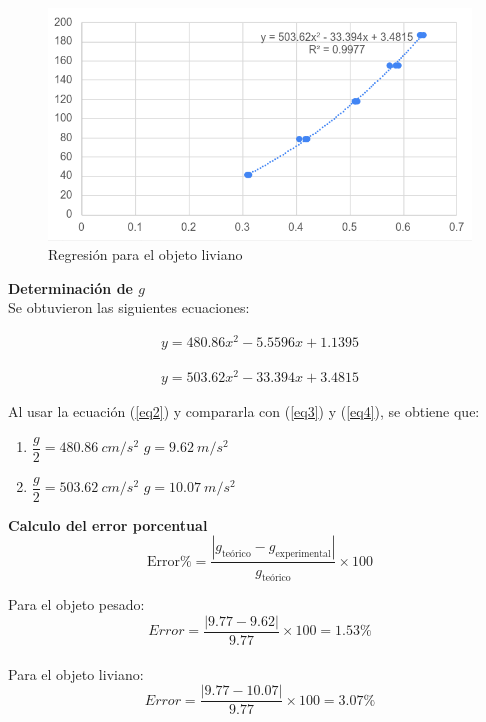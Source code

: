 \begin{multicols}{2}
\begin{figure}[H]
    \caption{Regresión para el objeto liviano}
    \centering
    \includegraphics[scale=0.5]{fig/regresion-ObjetoLiviano.png}
\end{figure}

\textbf{Determinación de $g$} \\
Se obtuvieron las siguientes ecuaciones:

\begin{align}\label{eq3}
    y = 480.86x^2 - 5.5596x + 1.1395
\end{align}

\begin{align}\label{eq4}
    y = 503.62x^2 - 33.394x + 3.4815
\end{align}

Al usar la ecuación (\ref{eq2}) y compararla con (\ref{eq3}) y (\ref{eq4}), se obtiene que:
\begin{enumerate}
    \item $\dfrac{g}{2} = 480.86 \ cm/s^2$ \hspace{1cm} $g = 9.62 \ m/s^2$
    \item $\dfrac{g}{2} = 503.62 \ cm/s^2$ \hspace{1cm} $g = 10.07 \ m/s^2$
\end{enumerate}

\textbf{Calculo del error porcentual} \\

\[\text{Error\%} = \frac{|g_{\text{teórico}} - g_{\text{experimental}}|}{g_{\text{teórico}}} \times 100 \]

Para el objeto pesado: \[Error = \dfrac{|9.77 - 9.62|}{9.77} \times 100 = 1.53\%\] \\
Para el objeto liviano: \[Error = \dfrac{|9.77 - 10.07|}{9.77} \times 100 = 3.07\%\]


\end{multicols}

